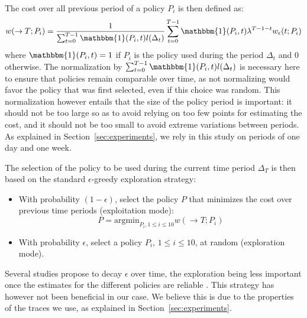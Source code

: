 \documentclass[sigconf,review]{acmart}
\begin{document}

The cost over all previous period of a policy $P_i$ is then defined as:
%
\begin{equation} \label{eq:tot-cost-greedy} w(\rightarrow T;P_i) =
\frac{1}{\sum_{t=0}^{T-1} \mathbbm{1}(P_i,t) l(\Delta_t)} \sum_{t=0}^{T-1}
\mathbbm{1}(P_i,t) \lambda^{T-1-t} w_{\epsilon}(t;P_i) \end{equation}
%
where $\mathbbm{1}(P_i,t) = 1$ if $P_i$ is the policy used during the period
$\Delta_t$ and $0$ otherwise. The normalization by $\sum_{t=0}^{T-1}
\mathbbm{1}(P_i,t) l(\Delta_t)$ is necessary here to ensure that policies
remain comparable over time, as not normalizing would favor the policy that was
first selected, even if this choice was random. This normalization however
entails that the size of the policy period is important: it should not be too
large so as to avoid relying on too few points for estimating the cost, and it
should not be too small to avoid extreme variations between periods. As
explained in Section~\ref{sec:experiments}, we rely in this study on periods of
one day and one week.

The selection of the policy to be used during the current time period
$\Delta_T$ is then based on the standard $\epsilon$-greedy exploration
strategy:

%
\begin{itemize}
\item With probability $(1-\epsilon)$, select the policy $P$ that minimizes the cost over previous time periods (exploitation mode):
%
\begin{equation}
\label{eq:select-greedy}
P = \mbox{argmin}_{P_i, 1 \le i \le 10} w(\rightarrow T;P_i)
\end{equation}
%
\item With probability $\epsilon$, select a policy $P_i, \, 1 \le i \le 10$, at random (exploration mode).
\end{itemize}

Several studies propose to decay $\epsilon$ over time, the exploration being
less important once the estimates for the different policies are reliable
\cite{Tokic:2010}. This strategy has however not been beneficial in our case.
We believe this is due to the properties of the traces we use, as
explained in Section~\ref{sec:experiments}.
\end{document}
